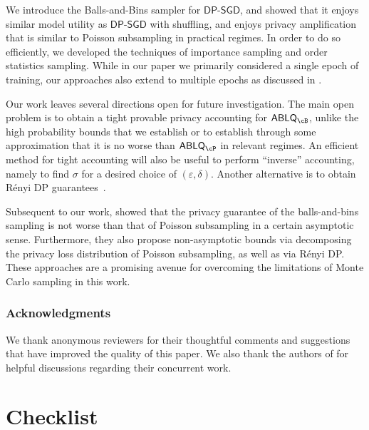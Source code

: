 \documentclass[twoside]{article}
\theoremstyle{definition}
\newcommand{\eps}{\varepsilon}
\newcommand{\BnB}{Balls-and-Bins\xspace}
\newcommand{\DPSGD}{\mathsf{DP}\text{-}\mathsf{SGD}}
\newcommand{\ABLQ}{\mathsf{ABLQ}}
\newcommand{\ABLQP}{\ABLQ_{\cP}}
\newcommand{\ABLQB}{\ABLQ_{\cB}}
\begin{document}
We introduce the \BnB sampler for $\DPSGD$, and showed that it enjoys similar model utility as $\DPSGD$ with shuffling, and enjoys privacy amplification that is similar to Poisson subsampling in practical regimes. In order to do so efficiently, we developed the techniques of importance sampling and order statistics sampling. While in our paper we primarily considered a single epoch of training, our approaches also extend to multiple epochs as discussed in .

Our work leaves several directions open for future investigation. The main open problem is to obtain a tight provable privacy accounting for $\ABLQB$, unlike the high probability bounds that we establish or to establish through some approximation that it is no worse than $\ABLQP$ in relevant regimes. An efficient method for tight accounting will also be useful to perform ``inverse'' accounting, namely to find $\sigma$ for a desired choice of $(\eps, \delta)$. Another alternative is to obtain R\'enyi DP guarantees~\citep{mironov17renyi}.

Subsequent to our work, \cite{feldmanshenfeld25} showed that the privacy guarantee of the balls-and-bins sampling is not worse than that of Poisson subsampling in a certain asymptotic sense. Furthermore, they also propose non-asymptotic bounds via decomposing the privacy loss distribution of Poisson subsampling, as well as via R\'enyi DP. These approaches are a promising avenue for overcoming the limitations of Monte Carlo sampling in this work.

\vspace{-2mm}
\subsubsection*{Acknowledgments}
\vspace{-2mm}
We thank anonymous reviewers for their thoughtful comments and suggestions that have improved the quality of this paper. We also thank the authors of \cite{choquettechoo24near} for helpful discussions regarding their concurrent work.

\newpage



\newpage
\section*{Checklist}

\newcommand{\YES}{{\bf Yes}}
\newcommand{\NO}{{\bf No}}
\newcommand{\NA}{{\bf Not Applicable}}
\end{document}
